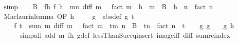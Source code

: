 \begin{isabellebody}
\ simp\isanewline
\isanewline
\ \ \isamarkupfalse%
\ B\ \ f{\isacharunderscore}{\kern0pt}h{\isacharcolon}{\kern0pt}\ {\isachardoublequoteopen}f\ h\ {\isacharequal}{\kern0pt}\ {\isacharparenleft}{\kern0pt}{\isasymSum}m{\isacharless}{\kern0pt}n{\isachardot}{\kern0pt}\ diff\ m\ {}\ {\isacharslash}{\kern0pt}\ fact\ m\ {\isacharasterisk}{\kern0pt}\ h\ {\isacharcircum}{\kern0pt}\ m{\isacharparenright}{\kern0pt}\ {\isacharplus}{\kern0pt}\ B\ {\isacharasterisk}{\kern0pt}\ {\isacharparenleft}{\kern0pt}h\ {\isacharcircum}{\kern0pt}\ n\ {\isacharslash}{\kern0pt}\ fact\ n{\isacharparenright}{\kern0pt}{\isachardoublequoteclose}\isanewline
\ \ \ \ \isamarkupfalse%
\ Maclaurin{\isacharunderscore}{\kern0pt}lemma\ {\isacharbrackleft}{\kern0pt}OF\ h{\isacharbrackright}{\kern0pt}\ \isacommand{{\isachardot}{\kern0pt}{\isachardot}{\kern0pt}}\isamarkupfalse%
\isanewline
\isanewline
\ \ \isamarkupfalse%
\ g\ \ {\isacharbrackleft}{\kern0pt}abs{\isacharunderscore}{\kern0pt}def{\isacharbrackright}{\kern0pt}{\isacharcolon}{\kern0pt}\ {\isachardoublequoteopen}g\ t\ {\isacharequal}{\kern0pt}\isanewline
\ \ \ \ f\ t\ {\isacharminus}{\kern0pt}\ {\isacharparenleft}{\kern0pt}sum\ {\isacharparenleft}{\kern0pt}{\isasymlambda}m{\isachardot}{\kern0pt}\ {\isacharparenleft}{\kern0pt}diff\ m\ {}\ {\isacharslash}{\kern0pt}\ fact\ m{\isacharparenright}{\kern0pt}\ {\isacharasterisk}{\kern0pt}\ t{\isacharcircum}{\kern0pt}m{\isacharparenright}{\kern0pt}\ {\isacharbraceleft}{\kern0pt}{\isachardot}{\kern0pt}{\isachardot}{\kern0pt}{\isacharless}{\kern0pt}n{\isacharbraceright}{\kern0pt}\ {\isacharplus}{\kern0pt}\ B\ {\isacharasterisk}{\kern0pt}\ {\isacharparenleft}{\kern0pt}t{\isacharcircum}{\kern0pt}n\ {\isacharslash}{\kern0pt}\ fact\ n{\isacharparenright}{\kern0pt}{\isacharparenright}{\kern0pt}{\isachardoublequoteclose}\ \ t\isanewline
\ \ \isamarkupfalse%
\ g{}{\isacharcolon}{\kern0pt}\ {\isachardoublequoteopen}g\ {}\ {\isacharequal}{\kern0pt}\ {}{\isachardoublequoteclose}\ {\isachardoublequoteopen}g\ h\ {\isacharequal}{\kern0pt}\ {}{\isachardoublequoteclose}\isanewline
\ \ \ \ \isamarkupfalse%
\ {\isacharparenleft}{\kern0pt}simp{\isacharunderscore}{\kern0pt}all\ add{\isacharcolon}{\kern0pt}\ m\ f{\isacharunderscore}{\kern0pt}h\ g{\isacharunderscore}{\kern0pt}def\ lessThan{\isacharunderscore}{\kern0pt}Suc{\isacharunderscore}{\kern0pt}eq{\isacharunderscore}{\kern0pt}insert{\isacharunderscore}{\kern0pt}{}\ image{\isacharunderscore}{\kern0pt}iff\ diff{\isacharunderscore}{\kern0pt}{}\ sum{\isachardot}{\kern0pt}reindex{\isacharparenright}{\kern0pt}\isanewline

\end{isabellebody}
